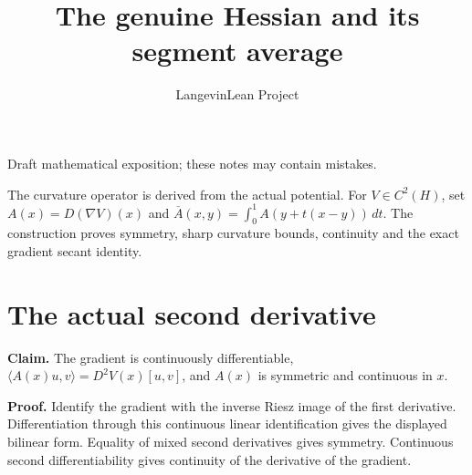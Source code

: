 \documentclass[11pt,a4paper]{article}
\title{\texorpdfstring{The genuine Hessian and its segment average}{The genuine Hessian and its segment average}}
\author{LangevinLean Project}
\date{}
\begin{document}
\maketitle
Draft mathematical exposition; these notes may contain mistakes.


The curvature operator is derived from the actual potential. For \(V\in C^2(H)\), set \(A(x)=D(\nabla V)(x)\) and \(\overline A(x,y)=\int_0^1 A(y+t(x-y))\,dt\). The construction proves symmetry, sharp curvature bounds, continuity and the exact gradient secant identity.


\section{\texorpdfstring{The actual second derivative}{The actual second derivative}}


\textbf{Claim.} The gradient is continuously differentiable, \(\langle A(x)u,v\rangle=D^2V(x)[u,v]\), and \(A(x)\) is symmetric and continuous in \(x\).



\textbf{Proof.} Identify the gradient with the inverse Riesz image of the first derivative. Differentiation through this continuous linear identification gives the displayed bilinear form. Equality of mixed second derivatives gives symmetry. Continuous second differentiability gives continuity of the derivative of the gradient.
\end{document}
